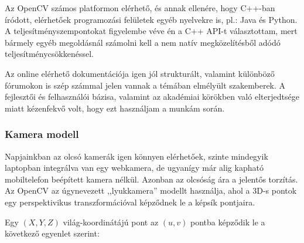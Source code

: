 \documentclass[a4paper,oneside]{article}
\begin{document}
Az OpenCV számos platformon elérhető, és annak ellenére, hogy C++-ban íródott, elérhetőek programozási felületek egyéb nyelvekre is, pl.: Java és Python. A teljesítményszempontokat figyelembe véve én a C++ API-t választottam, mert bármely egyéb megoldásnál számolni kell a nem natív megközelítésből adódó teljesítménycsökkenéssel.

Az online elérhető dokumentációja \cite{opencv-doc} igen jól strukturált, valamint különböző fórumokon \cite{stackoverflow} is szép számmal jelen vannak a témában elmélyült szakemberek. A fejlesztői és felhasználói bázisa, valamint az akadémiai körökben való elterjedtsége miatt kézenfekvő volt, hogy ezt használjam a munkám során.

\subsubsection{Kamera modell}

Napjainkban az olcsó kamerák igen könnyen elérhetőek, szinte mindegyik laptopban integrálva van egy webkamera, de ugyanígy már alig kapható mobiltelefon beépített kamera nélkül. Azonban az olcsóság ára a jelentős torzítás. Az OpenCV az úgynevezett ,,lyukkamera'' modellt használja, ahol a 3D-s pontok egy perspektivikus transzformációval képződnek le a képsík pontjaira.

Egy $(X,Y,Z)$ világ-koordinátájú pont az $(u,v)$ pontba képződik le \cite{camera-calib-3d} \cite[2.2. fejezet]{pinhole-model} a következő egyenlet szerint:
\end{document}
